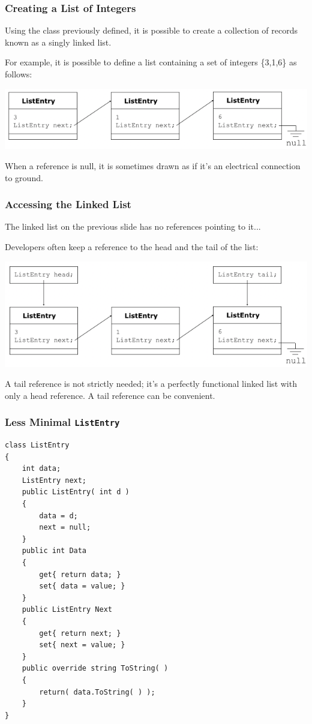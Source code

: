\begin{frame}
\frametitle{Creating a List of Integers}

Using the class previously defined, it is possible to create a collection of records known as a singly linked list.

For example, it is possible to define a list containing a set of integers \{3,1,6\} as follows:

\begin{center}
    \includegraphics[width=\textwidth]{images/list316.png}
\end{center}

When a reference is null, it is sometimes drawn as if it's an electrical connection to ground.

\end{frame}

\begin{frame}
\frametitle{Accessing the Linked List}
The linked list on the previous slide has no references pointing to it...

Developers often keep a reference to the head and the tail of the list:

\begin{center}
    \includegraphics[width=\textwidth]{images/listheadtail.png}
\end{center}

A tail reference is not strictly needed; it's a perfectly functional linked list with only a head reference. A tail reference can be convenient.

\end{frame}

\begin{frame}[fragile]
\frametitle{Less Minimal \texttt{ListEntry}}
{\scriptsize
\begin{verbatim}
class ListEntry
{
    int data;
    ListEntry next;
    public ListEntry( int d )
    {
        data = d;
        next = null;
    }
    public int Data
    {
        get{ return data; }
        set{ data = value; }
    }
    public ListEntry Next
    {
        get{ return next; }
        set{ next = value; }
    }
    public override string ToString( )
    {
        return( data.ToString( ) );
    }
}
\end{verbatim}
}
\end{frame}


